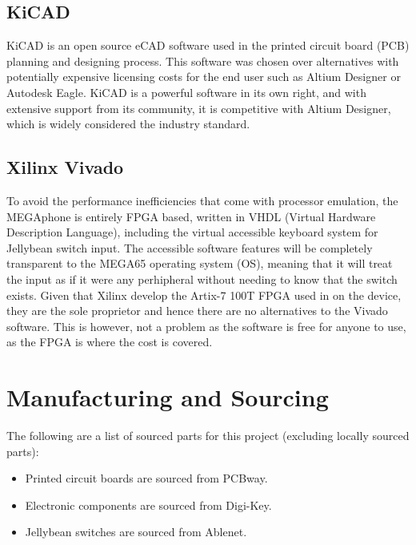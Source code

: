 \subsection{KiCAD}

KiCAD is an open source eCAD software used in the printed circuit board (PCB) planning and designing process.
This software was chosen over alternatives with potentially expensive licensing costs for the end user such as Altium Designer or Autodesk Eagle.
KiCAD is a powerful software in its own right, and with extensive support from its community, it is competitive with Altium Designer, which is widely considered the industry standard.


\subsection{Xilinx Vivado}

To avoid the performance inefficiencies that come with processor emulation, the MEGAphone is entirely FPGA based, written in VHDL (Virtual Hardware Description Language), including the virtual accessible keyboard system for Jellybean switch input.
The accessible software features will be completely transparent to the MEGA65 operating system (OS), meaning that it will treat the input as if it were any perhipheral without needing to know that the switch exists.
Given that Xilinx develop the Artix-7 100T FPGA used in on the device, they are the sole proprietor and hence there are no alternatives to the Vivado software.
This is however, not a problem as the software is free for anyone to use, as the FPGA is where the cost is covered.


\section{Manufacturing and Sourcing}

The following are a list of sourced parts for this project (excluding locally sourced parts):

\begin{itemize} 
    \item Printed circuit boards are sourced from PCBway. %
    \item Electronic components are sourced from Digi-Key.
    \item Jellybean switches are sourced from Ablenet.
    \end{itemize}

